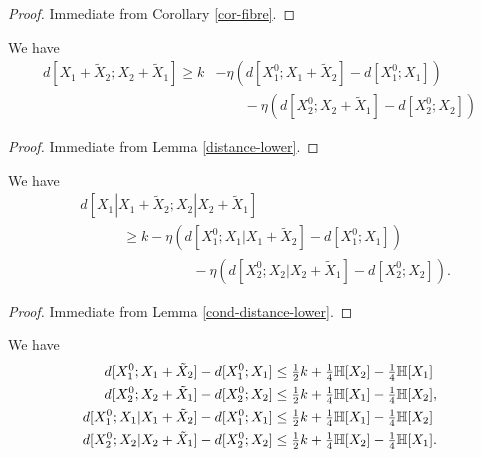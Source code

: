 \begin{proof} \leanok  Immediate from Corollary \ref{cor-fibre}.
\end{proof}

\begin{lemma}\label{first-dist-sum}
  \leanok
  We have
  \begin{align*}
    d[X_1+\tilde X_2; X_2+\tilde X_1] \geq k &- \eta (d[X^0_1; X_1+\tilde X_2] - d[X^0_1; X_1]) \\& \qquad- \eta (d[X^0_2; X_2+\tilde X_1] - d[X^0_2; X_2])
  \end{align*}
\end{lemma}


\begin{proof}\leanok Immediate from Lemma \ref{distance-lower}.
\end{proof}

\begin{lemma}\label{first-cond}
  \leanok
  We have
  \begin{align*}
    & d[X_1|X_1+\tilde X_2; X_2|X_2+\tilde X_1]  \\  & \qquad\quad \geq k - \eta (d[X^0_1; X_1 | X_1 + \tilde X_2] - d[X^0_1; X_1]) \\
    & \qquad\qquad\qquad\qquad  - \eta(d[X^0_2; X_2 | X_2 + \tilde X_1] - d[X^0_2; X_2]).
  \end{align*}
\end{lemma}

\begin{proof}\leanok Immediate from Lemma \ref{cond-distance-lower}.
\end{proof}

\begin{lemma}\label{first-upper}\leanok
  We have
  \begin{align*}
    d[X^0_1; X_1+\tilde X_2] - d[X^0_1; X_1] &\leq \tfrac{1}{2} k + \tfrac{1}{4} \mathbb{H}[X_2] - \tfrac{1}{4} \mathbb{H}[X_1]\\
    d[X^0_2;X_2+\tilde X_1] - d[X^0_2; X_2] &\leq \tfrac{1}{2} k + \tfrac{1}{4} \mathbb{H}[X_1] - \tfrac{1}{4} \mathbb{H}[X_2], \\
    d[X_1^0;X_1|X_1+\tilde X_2] - d[X_1^0;X_1] &\leq \tfrac{1}{2} k + \tfrac{1}{4} \mathbb{H}[X_1] - \tfrac{1}{4} \mathbb{H}[X_2]  \\
    d[X_2^0; X_2|X_2+\tilde X_1] - d[X_2^0; X_2] &\leq \tfrac{1}{2}k + \tfrac{1}{4} \mathbb{H}[X_2] - \tfrac{1}{4} \mathbb{H}[X_1].
  \end{align*}
\end{lemma}

